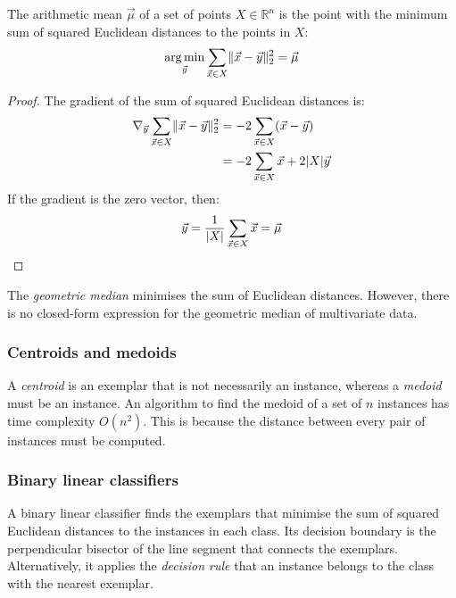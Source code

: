 \begin{thm}
  The arithmetic mean $\vec{\mu}$ of a set of points $X \in \mathbb{R}^n$ is the
  point with the minimum sum of squared Euclidean distances to the points in $X$:
  \begin{equation}
    \operatorname*{arg\,min}_{\vec{y}} \sum_{\vec{x} \in X} \lVert \vec{x} - \vec{y} \rVert_{2}^{2} = \vec{\mu}
  \end{equation}
  \begin{proof}
    The gradient of the sum of squared Euclidean distances is:
    \begin{align*}
      \nabla_{\vec{y}} \sum_{\vec{x} \in X} \lVert \vec{x} - \vec{y} \rVert_{2}^{2}
       & = - 2 \sum_{\vec{x} \in X} (\vec{x} - \vec{y})          \\
       & = - 2 \sum_{\vec{x} \in X} \vec{x} + 2 |X| \vec{y}
    \end{align*}
    If the gradient is the zero vector, then:
    \begin{equation*}
      \vec{y} = \frac{1}{|X|} \sum_{\vec{x} \in X} \vec{x} = \vec{\mu}
    \end{equation*}
  \end{proof}
\end{thm}

The \textit{geometric median} minimises the sum of Euclidean distances.
However, there is no closed-form expression for the geometric median of
multivariate data.

\subsubsection{Centroids and medoids}
\label{par:8:centroids-and-medoids}

A \textit{centroid} is an exemplar that is not necessarily an instance, whereas
a \textit{medoid} must be an instance.
An algorithm to find the medoid of a set of $n$ instances has time complexity
$O(n^2)$.
This is because the distance between every pair of instances must be computed.

\subsubsection{Binary linear classifiers}
\label{par:8:binary-linear-classifiers}

A binary linear classifier finds the exemplars that minimise the sum of squared
Euclidean distances to the instances in each class.
Its decision boundary is the perpendicular bisector of the line segment that
connects the exemplars.
Alternatively, it applies the \textit{decision rule} that an instance belongs to
the class with the nearest exemplar.

